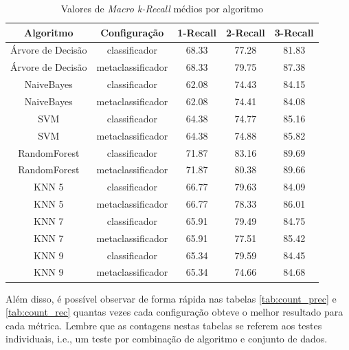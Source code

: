 \begin{table}[h!]
  \begin{center}
    \resizebox{\textwidth}{!} {
    \begin{tabular}{ccccc}
      \hline
      \textbf{Algoritmo} & \textbf{Configuração} & \textbf{1-Recall} & \textbf{2-Recall} & \textbf{3-Recall}\\
      \hline


Árvore de Decisão	&	classificador	&	68.33	&	77.28	&	81.83	\\
Árvore de Decisão	&	metaclassificador	&	68.33	&	79.75	&	87.38	\\
NaiveBayes	&	classificador	&	62.08	&	74.43	&	84.15	\\
NaiveBayes	&	metaclassificador	&	62.08	&	74.41	&	84.08	\\
SVM	&	classificador	&	64.38	&	74.77	&	85.16	\\
SVM	&	metaclassificador	&	64.38	&	74.88	&	85.82	\\
RandomForest	&	classificador	&	71.87	&	83.16	&	89.69	\\
RandomForest	&	metaclassificador	&	71.87	&	80.38	&	89.66	\\
KNN 5	&	classificador	&	66.77	&	79.63	&	84.09	\\
KNN 5	&	metaclassificador	&	66.77	&	78.33	&	86.01	\\
KNN 7	&	classificador	&	65.91	&	79.49	&	84.75	\\
KNN 7	&	metaclassificador	&	65.91	&	77.51	&	85.42	\\
KNN 9	&	classificador	&	65.34	&	79.59	&	84.45	\\
KNN 9	&	metaclassificador	&	65.34	&	74.66	&	84.68	\\

      \hline
    \end{tabular}
    }
    \caption{Valores de \textit{Macro k-Recall} médios por algoritmo}
    \label{tab:rec}
  \end{center}
\end{table}

Além disso, é possível observar de forma rápida nas tabelas \ref{tab:count_prec} e \ref{tab:count_rec} quantas vezes cada configuração obteve o melhor resultado para cada métrica.
Lembre que as contagens nestas tabelas se referem aos testes individuais, i.e., um teste por combinação de algoritmo e conjunto de dados.

